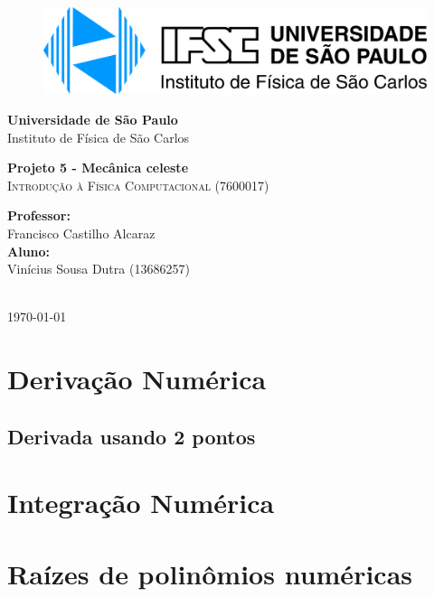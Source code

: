 \documentclass{article}
\newcommand{\theauthor}{Vinícius Sousa Dutra (13686257)}
\newcommand{\thetitle}{Projeto 5 - Mecânica celeste}
\begin{document}
\begin{titlepage}
    \begin{center}
        \begin{figure}[htb!]
            \centering
            \includegraphics[width=150mm]{images/ifsc_logo.jpg}
        \end{figure}
        \vspace{20pt}
        \LARGE{\textbf{Universidade de São Paulo}}\\
        \LARGE{Instituto de Física de São Carlos}\\

        \vspace{150pt}

        
        \LARGE{\textbf{{\thetitle}}} 
        \\ 
        \textsc{\LARGE Introdução à Física Computacional (7600017)}
        \\
        
        
        \vspace{125pt}
        \begin{minipage}{\textwidth}
            \begin{flushleft} \large
                \textbf{Professor:}\\
                Francisco Castilho Alcaraz\\[0.8cm]
                \textbf{Aluno:}\\
                \theauthor
                
                \end{flushleft}
                \end{minipage}\\[1 cm]
        \vspace{30pt}
        \vspace{\fill}  
        \Large {\today}

    \end{center}
\end{titlepage}

\newpage
\tableofcontents
\listoffigures
\listoftables
\listoflistings

\section{Derivação Numérica}
\subsection{Derivada usando 2 pontos}

\section{Integração Numérica}




\section{Raízes de polinômios numéricas}
\end{document}
